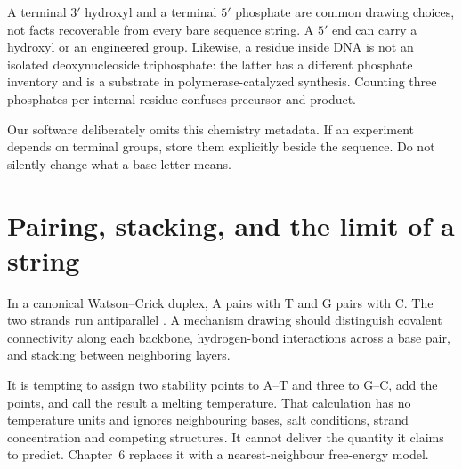 
A terminal $3'$ hydroxyl and a terminal $5'$ phosphate are common drawing
choices, not facts recoverable from every bare sequence string. A $5'$ end
can carry a hydroxyl or an engineered group. Likewise, a residue inside DNA
is not an isolated deoxynucleoside triphosphate: the latter has a different
phosphate inventory and is a substrate in polymerase-catalyzed synthesis.
Counting three phosphates per internal residue confuses precursor and product.

Our software deliberately omits this chemistry metadata. If an experiment
depends on terminal groups, store them explicitly beside the sequence.
Do not silently change what a base letter means.

\section{Pairing, stacking, and the limit of a string}

In a canonical Watson--Crick duplex, A pairs with T and G pairs with C.
The two strands run antiparallel \cite{NHGRIDNA}. A mechanism drawing should
distinguish covalent connectivity along each backbone, hydrogen-bond
interactions across a base pair, and stacking between neighboring layers.


\begin{Pitfall}
It is tempting to assign two stability points to A--T and three to G--C, add
the points, and call the result a melting temperature. That calculation has no
temperature units and ignores neighbouring bases, salt conditions, strand
concentration and competing structures. It cannot deliver the quantity it
claims to predict. Chapter~6 replaces it with a nearest-neighbour free-energy
model.
\end{Pitfall}

